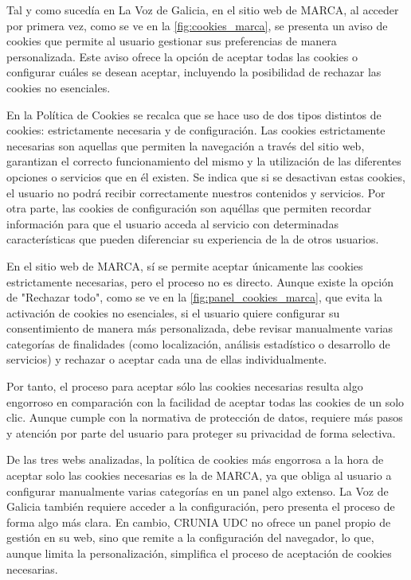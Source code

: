 Tal y como sucedía en La Voz de Galicia, en el sitio web de MARCA, al acceder por primera vez, como se ve en la \ref{fig:cookies_marca}, se presenta un aviso de cookies que permite al usuario gestionar sus preferencias de manera personalizada. Este aviso ofrece la opción de aceptar todas las cookies o configurar cuáles se desean aceptar, incluyendo la posibilidad de rechazar las cookies no esenciales.  

En la Política de Cookies se recalca que se hace uso de dos tipos distintos de cookies: estrictamente necesaria y de configuración. Las cookies estrictamente necesarias son aquellas que permiten la navegación a través del sitio web, garantizan el correcto funcionamiento del mismo y la utilización de las diferentes opciones o servicios que en él existen. Se indica que si se desactivan estas cookies, el usuario no podrá recibir correctamente nuestros contenidos y servicios. Por otra parte, las cookies de configuración son aquéllas que permiten recordar información para que el usuario acceda al servicio con determinadas características que pueden diferenciar su experiencia de la de otros usuarios. 

En el sitio web de MARCA, sí se permite aceptar únicamente las cookies estrictamente necesarias, pero el proceso no es directo. Aunque existe la opción de "Rechazar todo", como se ve en la \ref{fig:panel_cookies_marca}, que evita la activación de cookies no esenciales, si el usuario quiere configurar su consentimiento de manera más personalizada, debe revisar manualmente varias categorías de finalidades (como localización, análisis estadístico o desarrollo de servicios) y rechazar o aceptar cada una de ellas individualmente. 

Por tanto, el proceso para aceptar sólo las cookies necesarias resulta algo engorroso en comparación con la facilidad de aceptar todas las cookies de un solo clic. Aunque cumple con la normativa de protección de datos, requiere más pasos y atención por parte del usuario para proteger su privacidad de forma selectiva. 


De las tres webs analizadas, la política de cookies más engorrosa a la hora de aceptar solo las cookies necesarias es la de MARCA, ya que obliga al usuario a configurar manualmente varias categorías en un panel algo extenso. La Voz de Galicia también requiere acceder a la configuración, pero presenta el proceso de forma algo más clara. En cambio, CRUNIA UDC no ofrece un panel propio de gestión en su web, sino que remite a la configuración del navegador, lo que, aunque limita la personalización, simplifica el proceso de aceptación de cookies necesarias. 


